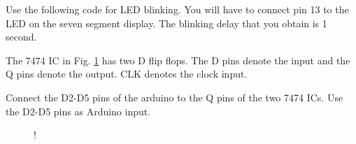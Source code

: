 

%
%
\begin{problem}
\label{prob:delay}
Use the following code for LED blinking. You will have to connect pin 13 to the LED on the seven segment display.  The blinking delay that you obtain is 1 second.
\end{problem}

%
%

%
%
%	
The 7474 IC in Fig. \ref{fig:7474} has two D flip flops.  The D pins denote the input and the Q pins denote the output. CLK denotes the clock input.
%
\begin{problem}
%
Connect the D2-D5 pins of the arduino to the Q pins of the two 7474 ICs. Use the D2-D5 pins as Arduino input.
\end{problem}
%
\begin{figure}[!h]
\begin{center}
\resizebox {\columnwidth} {!} {

}
\end{center}
\caption{}
\label{fig:7474}
\end{figure}

